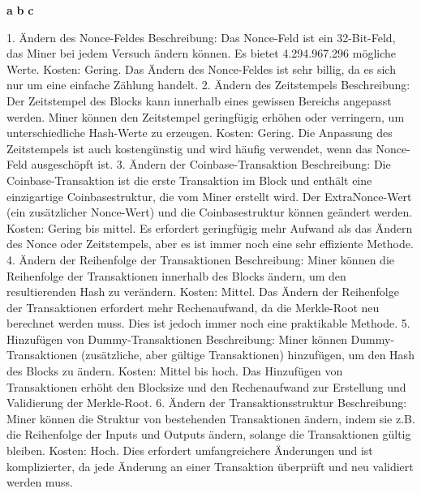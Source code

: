 \documentclass[german]{../uebung}
\begin{document}
\begin{exercise}{1}

\end{exercise}

\begin{exercise}{2}
    \textbf{a}
    \textbf{b}
    \textbf{c}
\end{exercise}

\begin{exercise}{3}
    1. Ändern des Nonce-Feldes
    Beschreibung: Das Nonce-Feld ist ein 32-Bit-Feld, das Miner bei jedem Versuch ändern können. Es bietet 4.294.967.296 mögliche Werte.
    Kosten: Gering. Das Ändern des Nonce-Feldes ist sehr billig, da es sich nur um eine einfache Zählung handelt.
    2. Ändern des Zeitstempels
    Beschreibung: Der Zeitstempel des Blocks kann innerhalb eines gewissen Bereichs angepasst werden. Miner können den Zeitstempel geringfügig erhöhen oder verringern, um unterschiedliche Hash-Werte zu erzeugen.
    Kosten: Gering. Die Anpassung des Zeitstempels ist auch kostengünstig und wird häufig verwendet, wenn das Nonce-Feld ausgeschöpft ist.
    3. Ändern der Coinbase-Transaktion
    Beschreibung: Die Coinbase-Transaktion ist die erste Transaktion im Block und enthält eine einzigartige Coinbasestruktur, die vom Miner erstellt wird. Der ExtraNonce-Wert (ein zusätzlicher Nonce-Wert) und die Coinbasestruktur können geändert werden.
    Kosten: Gering bis mittel. Es erfordert geringfügig mehr Aufwand als das Ändern des Nonce oder Zeitstempels, aber es ist immer noch eine sehr effiziente Methode.
    4. Ändern der Reihenfolge der Transaktionen
    Beschreibung: Miner können die Reihenfolge der Transaktionen innerhalb des Blocks ändern, um den resultierenden Hash zu verändern.
    Kosten: Mittel. Das Ändern der Reihenfolge der Transaktionen erfordert mehr Rechenaufwand, da die Merkle-Root neu berechnet werden muss. Dies ist jedoch immer noch eine praktikable Methode.
    5. Hinzufügen von Dummy-Transaktionen
    Beschreibung: Miner können Dummy-Transaktionen (zusätzliche, aber gültige Transaktionen) hinzufügen, um den Hash des Blocks zu ändern.
    Kosten: Mittel bis hoch. Das Hinzufügen von Transaktionen erhöht den Blocksize und den Rechenaufwand zur Erstellung und Validierung der Merkle-Root.
    6. Ändern der Transaktionsstruktur
    Beschreibung: Miner können die Struktur von bestehenden Transaktionen ändern, indem sie z.B. die Reihenfolge der Inputs und Outputs ändern, solange die Transaktionen gültig bleiben.
    Kosten: Hoch. Dies erfordert umfangreichere Änderungen und ist komplizierter, da jede Änderung an einer Transaktion überprüft und neu validiert werden muss.
\end{exercise}
\end{document}
